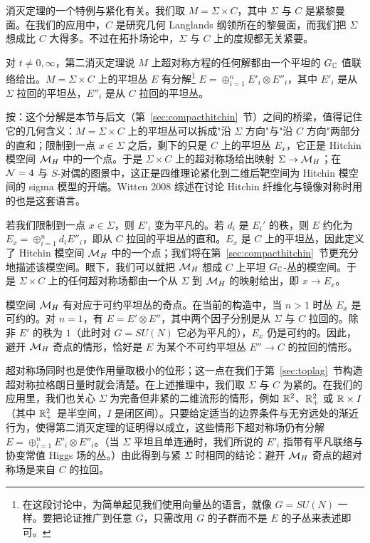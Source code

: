 \par{}

消灭定理的一个特例与紧化有关。我们取 $M=\Sigma\times C$，其中 $\Sigma$ 与 $C$ 是紧黎曼面。在我们的应用中，$C$ 是研究几何 Langlands 纲领所在的黎曼面，而我们把 $\Sigma$ 想成比 $C$ 大得多。不过在拓扑场论中，$\Sigma$ 与 $C$ 上的度规都无关紧要。

对 $t\not=0,\infty$，第二消灭定理说 $M$ 上超对称方程的任何解都由一个平坦的 $G_{\Bbb{C}}$ 值联络给出。$M=\Sigma\times C$ 上的平坦丛 $E$ 有分解\footnote{在这段讨论中，为简单起见我们使用向量丛的语言，就像 $G=SU(N)$ 一样。要把论证推广到任意 $G$，只需改用 $G$ 的子群而不是 $E$ 的子丛来表述即可。} $E=\oplus_{i=1}^n E'_i\otimes E''_i$，其中 $E'_i$ 是从 $\Sigma$ 拉回的平坦丛，$E''_i$ 是从 $C$ 拉回的平坦丛。

\begin{yizhu}[物理图像]
按：这个分解是本节与后文（第~\ref{sec:compacthitchin}~节）之间的桥梁，值得记住它的几何含义：$M=\Sigma\times C$ 上的平坦丛可以拆成"沿 $\Sigma$ 方向"与"沿 $C$ 方向"两部分的直和；限制到一点 $x\in\Sigma$ 之后，剩下的只是 $C$ 上的平坦丛 $E_x$，它正是 Hitchin 模空间 ${\MH}$ 中的一个点。于是 $\Sigma\times C$ 上的超对称场给出映射 $\Sigma\to{\MH}$；在 ${\EUN}=4$ 与 $S$-对偶的图景中，这正是四维理论紧化到二维后靶空间为 Hitchin 模空间的 sigma 模型的开端。Witten 2008 综述在讨论 Hitchin 纤维化与镜像对称时用的也是这套语言。
\end{yizhu}

若我们限制到一点 $x\in \Sigma$，则 $E'_i$ 变为平凡的。若 $d_i$ 是 $E_i'$ 的秩，则 $E$ 约化为 $E_x=\oplus_{i=1}^n d_iE''_i$，即从 $C$ 拉回的平坦丛的直和。$E_x$ 是 $C$ 上的平坦丛，因此定义了 Hitchin 模空间 ${\MH}$ 中的一个点；我们将在第~\ref{sec:compacthitchin}~节更充分地描述该模空间。眼下，我们可以就把 ${\MH}$ 想成 $C$ 上平坦 $G_\Bbb{C}$-丛的模空间。于是 $\Sigma\times C$ 上的任何超对称场都由一个从 $\Sigma$ 到 ${\MH}$ 的映射给出，即 $x\to E_x$。

模空间 ${\MH}$ 有对应于可约平坦丛的奇点。在当前的构造中，当 $n>1$ 时丛 $E_x$ 是可约的。对 $n=1$，有 $E=E'\otimes E''$，其中两个因子分别是从 $\Sigma$ 与 $C$ 拉回的。除非 $E'$ 的秩为 $1$（此时对 $G=SU(N)$ 它必为平凡的），$E_x$ 仍是可约的。因此，避开 ${\MH}$ 奇点的情形，恰好是 $E$ 为某个不可约平坦丛 $E''\to C$ 的拉回的情形。

超对称场同时也是使作用量取极小的位形；这一点在我们于第~\ref{sec:toplag}~节构造超对称拉格朗日量时就会清楚。在上述推理中，我们取 $\Sigma$ 与 $C$ 为紧的。在我们的应用里，我们也关心 $\Sigma$ 为完备但非紧的二维流形的情形，例如 $\Bbb{R}^2$、$\Bbb{R}^2_+$ 或 $\Bbb{R}\times I$（其中 $\Bbb{R}^2_+$ 是半空间，$I$ 是闭区间）。只要给定适当的边界条件与无穷远处的渐近行为，使得第二消灭定理的证明得以成立，这些情形下超对称场仍有分解 $E=\oplus_{i=1}^nE'_i\otimes E''_i$。（当 $\Sigma$ 平坦且单连通时，我们所说的 $E'_i$ 指带有平凡联络与协变常值 Higgs 场的丛。）由此得到与紧 $\Sigma$ 时相同的结论：避开 ${\MH}$ 奇点的超对称场是来自 $C$ 的拉回。
